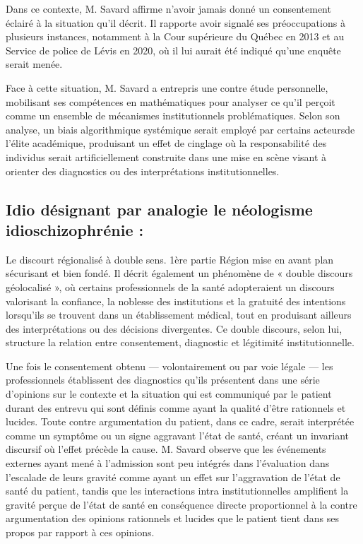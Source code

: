 \documentclass[12pt,letterpaper,oneside]{article}
\begin{document}
Dans ce contexte, M. Savard affirme n’avoir jamais donné un consentement éclairé à la situation qu’il décrit. Il rapporte avoir signalé ses préoccupations à plusieurs instances, notamment à la Cour supérieure du Québec en 2013 et au Service de police de Lévis en 2020, où il lui aurait été indiqué qu’une enquête serait menée.

Face à cette situation, M. Savard a entrepris une contre étude personnelle, mobilisant ses compétences en mathématiques pour analyser ce qu’il perçoit comme un ensemble de mécanismes institutionnels problématiques. Selon son analyse, un biais algorithmique systémique serait employé par certains acteursde l’élite académique, produisant un effet de cinglage où la responsabilité des individus serait artificiellement construite dans une mise en scène visant à orienter des diagnostics ou des interprétations institutionnelles.

\subsection*{Idio désignant par analogie le néologisme idioschizophrénie :}
Le discourt régionalisé à double sens. 1ère partie Région mise en avant plan sécurisant et bien fondé.
Il décrit également un phénomène de « double discours géolocalisé », où certains professionnels de la santé adopteraient un discours valorisant la confiance, la noblesse des institutions et la gratuité des intentions lorsqu’ils se trouvent dans un établissement médical, tout en produisant ailleurs des interprétations ou des décisions divergentes. Ce double discours, selon lui, structure la relation entre consentement, diagnostic et légitimité institutionnelle.

Une fois le consentement obtenu — volontairement ou par voie légale — les professionnels établissent des diagnostics qu’ils présentent dans une série d’opinions sur le contexte et la situation qui est communiqué par le patient durant des entrevu qui sont définis comme ayant la qualité d’être rationnels et lucides. Toute contre argumentation du patient, dans ce cadre, serait interprétée comme un symptôme ou un signe aggravant l’état de santé, créant un invariant discursif où l’effet précède la cause. M. Savard observe que les événements externes ayant mené à l’admission sont peu intégrés dans l’évaluation dans l’escalade de leurs gravité comme ayant un effet sur l’aggravation de l’état de santé du patient, tandis que les interactions intra institutionnelles amplifient la gravité perçue de l’état de santé en conséquence directe proportionnel à la contre argumentation des opinions rationnels et lucides que le patient tient dans ses propos par rapport à ces opinions.
\end{document}
